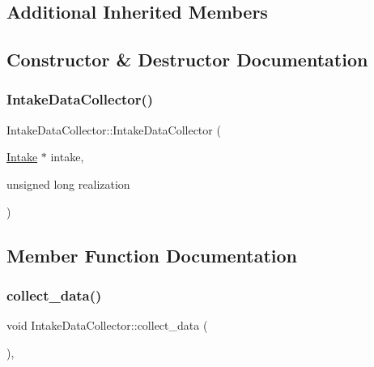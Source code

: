\subsection*{Additional Inherited Members}


\subsection{Constructor \& Destructor Documentation}
\mbox{\label{classIntakeDataCollector_a2ab4a81bec74a370c60c78609627e807}} 
\subsubsection{\texorpdfstring{Intake\+Data\+Collector()}{IntakeDataCollector()}}
{\footnotesize\ttfamily Intake\+Data\+Collector\+::\+Intake\+Data\+Collector (\begin{DoxyParamCaption}\item[{\mbox{\hyperlink{classIntake}{Intake}} $\ast$}]{intake,  }\item[{unsigned long}]{realization }\end{DoxyParamCaption})}



\subsection{Member Function Documentation}
\mbox{\label{classIntakeDataCollector_aed1610e5419465b35041b05b9f60c212}} 
\subsubsection{\texorpdfstring{collect\+\_\+data()}{collect\_data()}}
{\footnotesize\ttfamily void Intake\+Data\+Collector\+::collect\+\_\+data (\begin{DoxyParamCaption}{ }\end{DoxyParamCaption})\hspace{0.3cm}{\ttfamily [override]}, {\ttfamily [virtual]}}



